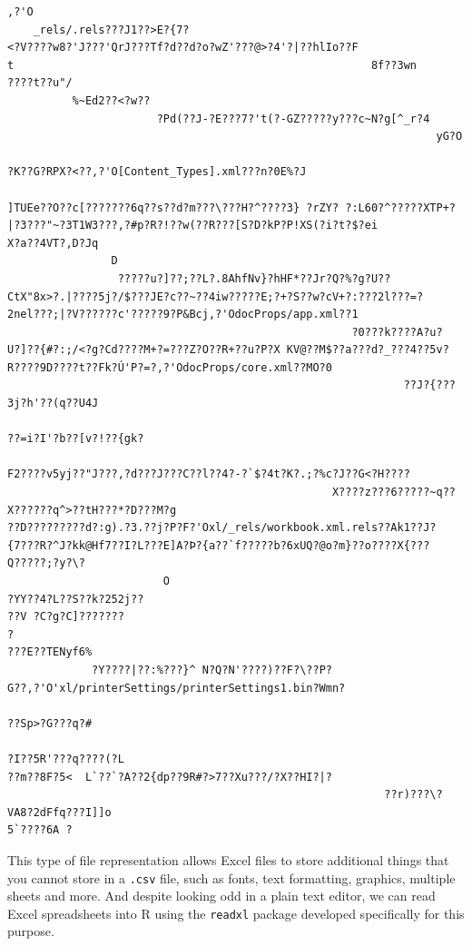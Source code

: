 \documentclass[
]{krantz}
\begin{document}
\begin{verbatim}
,?'O
    _rels/.rels???J1??>E?{7?
<?V????w8?'J???'QrJ???Tf?d??d?o?wZ'???@>?4'?|??hlIo??F
t                                                       8f??3wn
????t??u"/
          %~Ed2??<?w??
                       ?Pd(??J-?E???7?'t(?-GZ?????y???c~N?g[^_r?4
                                                                  yG?O
                                                                      ?K??G?RPX?<??,?'O[Content_Types].xml???n?0E%?J
                                                                                                                    ]TUEe??O??c[???????6q??s??d?m???\???H?^????3} ?rZY? ?:L60?^?????XTP+?|?3???"~?3T1W3???,?#p?R?!??w(??R???[S?D?kP?P!XS(?i?t?$?ei
X?a??4VT?,D?Jq
                D
                 ?????u?]??;??L?.8AhfNv}?hHF*??Jr?Q?%?g?U??CtX"8x>?.|????5j?/$???JE?c??~??4iw?????E;?+?S??w?cV+?:???2l???=?2nel???;|?V??????c'?????9?P&Bcj,?'OdocProps/app.xml??1
                                                     ?0???k????A?u?U?]??{#?:;/<?g?Cd????M+?=???Z?O??R+??u?P?X KV@??M$??a???d?_???4??5v?R????9D????t??Fk?Ú'P?=?,?'OdocProps/core.xml??MO?0
                                                             ??J?{???3j?h'??(q??U4J
                                                                                   ??=i?I'?b??[v?!??{gk?
                                                                                                         F2????v5yj??"J???,?d???J???C??l??4?-?`$?4t?K?.;?%c?J??G<?H????
                                                  X????z???6?????~q??X??????q^>??tH???*?D???M?g
??D?????????d?:g).?3.??j?P?F?'Oxl/_rels/workbook.xml.rels??Ak1??J?{7???R?^J?kk@Hf7??I?L???E]A?Þ?{a??`f?????b?6xUQ?@o?m}??o????X{???Q?????;?y?\?
                        O
?YY??4?L??S??k?252j??
??V ?C?g?C]???????
?
???E??TENyf6%
             ?Y????|??:%???}^ N?Q?N'????)??F?\??P?G??,?'O'xl/printerSettings/printerSettings1.bin?Wmn? 
                                                                                                        ??Sp>?G???q?#
                                                                                                                     ?I??5R'???q????(?L
??m??8F?5<  L`??`?A??2{dp??9R#?>7??Xu???/?X??HI?|?
                                                          ??r)???\?VA8?2dFfq???I]]o
5`????6A ?
\end{verbatim}

This type of file representation allows Excel files to store additional things that you cannot store in a \texttt{.csv} file, such as fonts, text formatting, graphics, multiple sheets
and more. And despite looking odd in a plain text editor, we can read Excel spreadsheets into R using the \texttt{readxl} package developed
specifically for this purpose.
\end{document}
